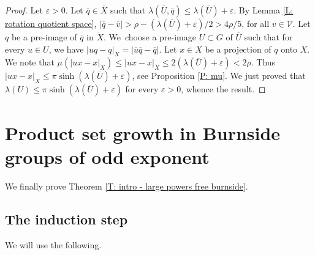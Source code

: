 \documentclass[JEP,XML,SOM,Unicode, NoEqCountersInSection,published]{cedram}
\let\mathcal\mathscr
\let\epsilon\varepsilon
\theoremstyle{plain}
\theoremstyle{definition}
\newcommand{\cX}{\dot{X}}
\newcommand{\q}[1]{\overline{#1}}
\begin{document}
\begin{proof}
Let $\epsilon > 0$.
Let $\q q \in \q X$ such that $\lambda(\q U, \q q) \leq \lambda(\q U) + \epsilon$.
By Lemma \ref{L: rotation quotient space}, $|\q q - \q v|> \rho - (\lambda(\q U)+\epsilon)/2>4\rho/5$, for all $v \in \mathcal V$.
Let $q$ be a pre-image of $\q q$ in $\cX$.
We~choose a pre-image $U \subset G$ of $\q U$ such that for every $u \in U$, we have $|uq-q|_{\cX}=|\q u \q q -\q q|$.
Let $x\in X$ be a projection of $q$ onto $X$. We note that $\mu (|ux-x|_X)\leqslant |ux-x|_{\cX}\leqslant 2(\lambda(\q U) +\epsilon)<2\rho$.
Thus $|ux-x|_X\leqslant \pi \sinh (\lambda(\q U)+\epsilon)$, see Proposition \ref{P: mu}.
We just proved that $\lambda(U) \leq \pi \sinh (\lambda(\q U)+\epsilon)$ for every $\epsilon > 0$, whence the result.
\end{proof}

\section{Product set growth in Burnside groups of odd exponent}

We finally prove Theorem \ref{T: intro - large powers free burnside}.

\subsection{The induction step}

We will use the following.
\end{document}
